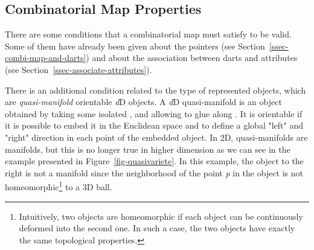 \subsection{Combinatorial Map Properties}\label{ssec-combimap-validity}

There are some conditions that a combinatorial map must satisfy to be
valid. Some of them have already been given about the \betats{} pointers
(see Section~\ref{ssec-combi-map-and-darts}) and about the association
between darts and attributes (see
Section~\ref{ssec-associate-attributes}).

There is an additional condition related to the type of represented
objects, which are \emph{quasi-manifold} orientable \emph{d}D objects.  A
\emph{d}D quasi-manifold is an object obtained by taking some isolated
, and allowing to glue  along . It is
orientable if it is possible to embed it in the Euclidean space and to
define a global "left" and "right" direction in each point of the
embedded object.  In 2D, quasi-manifolds are manifolds, but this is no
longer true in higher dimension as we can see in the example presented
in Figure~\ref{fig-quasivariete}.  In this example, the object to the
right is not a manifold since the neighborhood of the point \emph{p} in the
object is not homeomorphic\footnote{Intuitively, two objects are
  homeomorphic if each object can be continuously deformed into the
  second one.  In such a case, the two objects have exactly the same
  topological properties.}  to a 3D ball.
%
